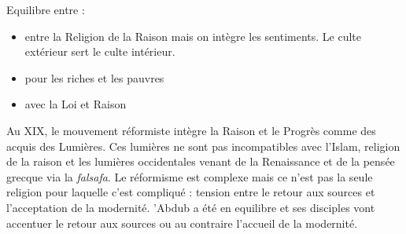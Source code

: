 Equilibre entre : 
\begin{itemize}
    \item entre la Religion de la Raison mais on intègre les sentiments. Le culte extérieur sert le culte intérieur. 
    \item pour les riches et les pauvres
    \item avec la Loi et Raison
\end{itemize}

\begin{Synthesis}
Au XIX, le mouvement réformiste intègre la Raison et le Progrès comme des acquis des Lumières. Ces lumières ne sont pas incompatibles avec l'Islam, religion de la raison et les lumières occidentales venant de la Renaissance et de la pensée grecque via la \textit{falsafa}.
Le réformisme est complexe mais ce n'est pas la seule religion pour laquelle c'est compliqué : tension entre le retour aux sources et l'acceptation de la modernité.
'Abdub a été en equilibre et ses disciples vont accentuer le retour aux sources ou au contraire l'accueil de la modernité. 
\end{Synthesis}
